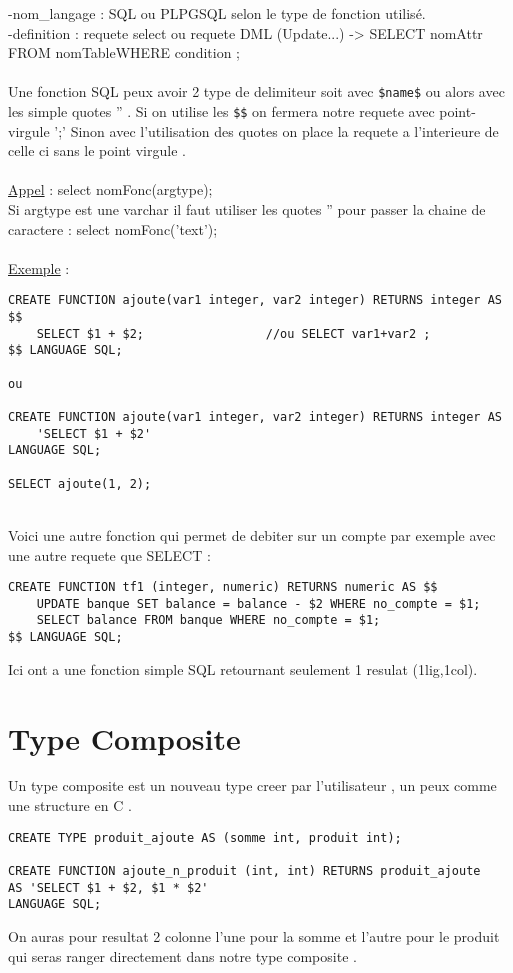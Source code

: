 \documentclass[a4paper,12pt,openany]{book}
\begin{document}
-nom\_langage : SQL ou PLPGSQL selon le type de fonction utilisé.\\
-definition : requete select ou requete DML (Update...) -> SELECT nomAttr FROM nomTableWHERE condition ; \\
\\
Une fonction SQL peux avoir 2 type de delimiteur soit avec \verb+$name$+ ou alors avec les simple quotes '' . Si on utilise les \verb+$$+ on fermera notre requete avec point-virgule ';' Sinon avec l'utilisation des quotes on place la requete a l'interieure de celle ci sans le point virgule .\\
\\
\underline{Appel} : select nomFonc(argtype); \\
Si argtype est une varchar il faut utiliser les quotes '' pour passer la chaine de caractere : select nomFonc('text');\\
\\
\underline{Exemple} : \\
\begin{verbatim}
CREATE FUNCTION ajoute(var1 integer, var2 integer) RETURNS integer AS $$
    SELECT $1 + $2; 				//ou SELECT var1+var2 ;
$$ LANGUAGE SQL;

ou

CREATE FUNCTION ajoute(var1 integer, var2 integer) RETURNS integer AS
    'SELECT $1 + $2'
LANGUAGE SQL;

SELECT ajoute(1, 2);
\end{verbatim}
\\
Voici une autre fonction qui permet de debiter sur un compte par exemple avec une autre requete que SELECT : \\
\begin{verbatim}
CREATE FUNCTION tf1 (integer, numeric) RETURNS numeric AS $$
    UPDATE banque SET balance = balance - $2 WHERE no_compte = $1;
    SELECT balance FROM banque WHERE no_compte = $1;
$$ LANGUAGE SQL;
\end{verbatim}

Ici ont a une fonction simple SQL retournant seulement 1 resulat (1lig,1col).\\

\section{Type Composite}
Un type composite est un nouveau type creer par l'utilisateur , un peux comme une structure en C .\\
\begin{verbatim}
CREATE TYPE produit_ajoute AS (somme int, produit int);

CREATE FUNCTION ajoute_n_produit (int, int) RETURNS produit_ajoute
AS 'SELECT $1 + $2, $1 * $2'
LANGUAGE SQL;
\end{verbatim}
On auras pour resultat 2 colonne l'une pour la somme et l'autre pour le produit qui seras ranger directement dans notre type composite .\\
\end{document}
